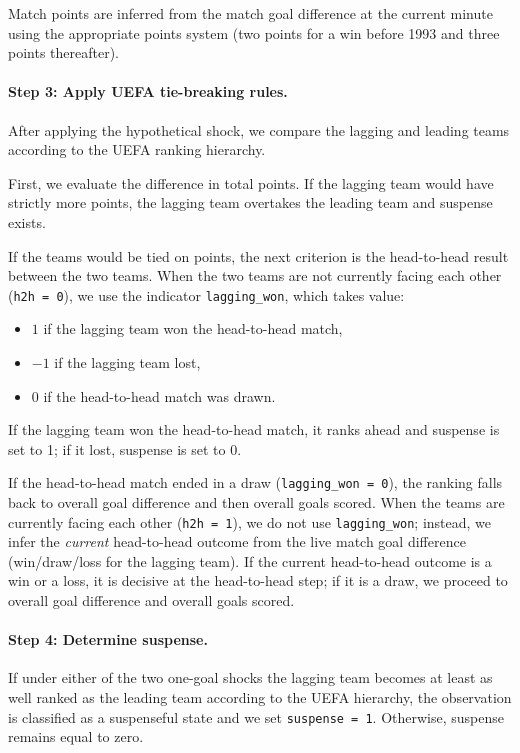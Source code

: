 \documentclass[11pt]{article}
\begin{document}
Match points are inferred from the match goal difference at the current minute using the appropriate points system (two points for a win before 1993 and three points thereafter).

\paragraph{Step 3: Apply UEFA tie-breaking rules.}
After applying the hypothetical shock, we compare the lagging and leading teams according to the UEFA ranking hierarchy.

First, we evaluate the difference in total points. If the lagging team would have strictly more points, the lagging team overtakes the leading team and suspense exists.

If the teams would be tied on points, the next criterion is the head-to-head result between the two teams. When the two teams are not currently facing each other (\texttt{h2h = 0}), we use the indicator \texttt{lagging\_won}, which takes value:
\begin{itemize}
    \item $1$ if the lagging team won the head-to-head match,
    \item $-1$ if the lagging team lost,
    \item $0$ if the head-to-head match was drawn.
\end{itemize}
If the lagging team won the head-to-head match, it ranks ahead and suspense is set to 1; if it lost, suspense is set to 0.

If the head-to-head match ended in a draw (\texttt{lagging\_won = 0}), the ranking falls back to overall goal difference and then overall goals scored. 
When the teams are currently facing each other (\texttt{h2h = 1}), we do not use \texttt{lagging\_won}; instead, we infer the \emph{current} head-to-head outcome from the live match goal difference (win/draw/loss for the lagging team). If the current head-to-head outcome is a win or a loss, it is decisive at the head-to-head step; if it is a draw, we proceed to overall goal difference and overall goals scored.

\paragraph{Step 4: Determine suspense.}
If under either of the two one-goal shocks the lagging team becomes at least as well ranked as the leading team according to the UEFA hierarchy, the observation is classified as a suspenseful state and we set \texttt{suspense = 1}. Otherwise, suspense remains equal to zero.
\end{document}
